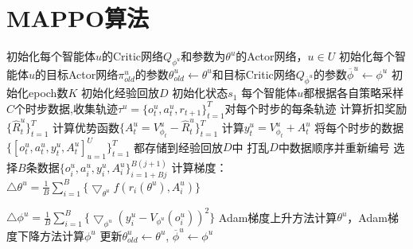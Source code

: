 \documentclass[11pt]{ctexart}
\begin{document}
\section{MAPPO算法}
\begin{algorithm}[H] %
	\renewcommand{\thealgorithm}{} %
	\caption{} 
	\begin{algorithmic}[1] %
		\STATE 初始化每个智能体$u$的Critic网络$Q_{\phi^u}$和参数为$\theta^u$的Actor网络，$u \in U$
		\STATE 初始化每个智能体$u$的目标Actor网络$\pi_{old}^u$的参数$\theta_{old}^u\leftarrow\theta^u$和目标Critic网络$Q_{\overline{\phi}^u}$的参数$\overline{\phi}^u\leftarrow\phi^u$
		\STATE 初始化epoch数$K$
		\STATE 初始化经验回放$D$
			\STATE 初始化状态$s_1$
			\STATE 每个智能体$u$都根据各自策略采样$C$个时步数据,收集轨迹$\tau^u = {\{o_t^u, a_t^u, r_{t+1}}\}_{t=1}^T$\footnotemark[3]
			\STATE 对每个时步的每条轨迹
			\STATE 计算折扣奖励$\{\hat{R}_t^u\}_{t=1}^T$
			\STATE 计算优势函数$\{A_t^u=V_{\phi_t}^u-\hat{R}_t^u\}_{t=1}^T$
			\STATE 计算$y_t^u=V_{\phi_t}^u+A_t^u$
			\STATE 将每个时步的数据$\{[o_t^u, a_t^u, y_t^u, A_t^u]_{u=1}^U\}_{t=1}^T$ 都存储到经验回放$D$中
				\STATE 打乱$D$中数据顺序并重新编号
					\STATE 选择$B$条数据$\{o_i^u, a_i^u, y_i^u, A_i^u\}_{i=1+Bj}^{B(j+1)}$
					\STATE 计算梯度：
					\STATE $\bigtriangleup\theta^u=\frac{1}{B}\sum_{i=1}^B\{\bigtriangledown_{\theta^u}f(r_i(\theta^u),A_i^u)\}$\footnotetext[4]
					
					\STATE $\bigtriangleup\phi^u=\frac{1}{B}\sum_{i=1}^B\{\bigtriangledown_{\phi^u}(y_i^u-V_{\phi^u}(o_i^u))^2\}$
					\STATE Adam梯度上升方法计算$\theta^u$，Adam梯度下降方法计算$\phi^u$
				\ENDFOR
			\ENDFOR
		\STATE 更新$\theta_{old}^u\leftarrow\theta^u$, $\overline{\phi}^u\leftarrow\phi^u$
		\ENDFOR
	\end{algorithmic}
\end{algorithm}
\clearpage
\end{document}
